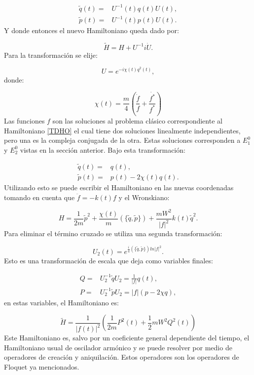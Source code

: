 \documentclass[a4paper,10pt]{report}
\begin{document}
\begin{align}
\tilde{q}(t) =& U^{-1}(t)q(t)U(t),\\
\tilde{p}(t) =& U^{-1}(t)p(t)U(t).
\end{align} Y donde entonces el nuevo Hamiltoniano queda dado por:

\begin{equation}
\tilde{H} = H + U^{-1}i\dot{U}.
\end{equation} Para la transformación se elije:

\begin{equation}
U = e^{-i\chi(t)q^2(t)},
\end{equation} donde:

\begin{equation}
\chi(t) = \frac{m}{4}(\frac{\dot{f}}{f}+\frac{\dot{f^*}}{f^*})
\end{equation} Las funciones $f$ son las soluciones al problema clásico correspondiente al Hamiltoniano \ref{TDHO} el cual tiene dos soluciones linealmente independientes, pero una es la compleja conjugada de la otra. Estas soluciones corresponden a $E_1^0$  y $E_2^0$ vistas en la sección anterior. Bajo esta transformación:

\begin{align}
\tilde{q}(t)=&q(t),\\
\tilde{p}(t)=&p(t)-2\chi(t)q(t).
\end{align}Utilizando esto se puede escribir el Hamiltoniano en las nuevas coordenadas tomando en cuenta que $\ddot{f}= -k(t)f$ y el Wronskiano:

\begin{equation}
 H = \frac{1}{2m}\tilde{p}^2 + \frac{\chi(t)}{m}(\{\tilde{q},\tilde{p}\}) + \frac{mW^2}{|f|^2}k(t)\tilde{q}^2.
\end{equation}Para eliminar el término cruzado se utiliza una segunda transformación:

\begin{equation}
U_2(t)=e^{\frac{i}{4}(\{\tilde{q},\tilde{p}\})ln|f|^2}.
\end{equation}Esto es una transformación de escala que deja como variables finales:

\begin{align}
Q=&U_2^{-1}\tilde{q}U_2 =\frac{1}{|f|}q(t),\\
P=&U_2^{-1}\tilde{p}U_2 = |f|(p-2\chi q), 
\end{align} en estas variables, el Hamiltoniano es:

\begin{equation}\label{QTDHO}
\tilde{H} = \frac{1}{|f(t)|^2}(\frac{1}{2m}P^2(t)+\frac{1}{2}mW^2Q^2(t))
\end{equation}Este Hamiltoniano es, salvo por un coeficiente general dependiente del tiempo, el Hamiltoniano usual de oscilador armónico y se puede resolver por medio de operadores de creación y aniquilación. Estos operadores son los operadores de Floquet ya mencionados.
\end{document}
